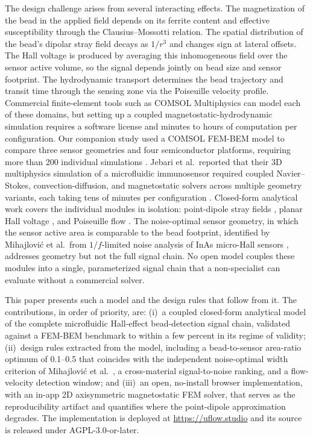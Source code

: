 \documentclass[biosensors,article,submit,pdftex,moreauthors]{Definitions/mdpi}
\begin{document}
The design challenge arises from several interacting effects. The magnetization of
the bead in the applied field depends on its ferrite content and effective
susceptibility through the Clausius--Mossotti relation. The spatial distribution
of the bead's dipolar stray field decays as $1/r^3$ and changes sign at lateral
offsets. The Hall voltage is produced by averaging this inhomogeneous field over
the sensor active volume, so the signal depends jointly on bead size and sensor
footprint. The hydrodynamic transport determines the bead trajectory and transit
time through the sensing zone via the Poiseuille velocity profile. Commercial
finite-element tools such as COMSOL Multiphysics can model each of these domains,
but setting up a coupled magnetostatic-hydrodynamic simulation requires a software
license and minutes to hours of computation per configuration. Our companion study
used a COMSOL FEM-BEM model to compare three sensor geometries and four
semiconductor platforms, requiring more than 200 individual simulations
\cite{govindaraju2025}. Jebari et al.\ reported that their 3D multiphysics
simulation of a microfluidic immunosensor required coupled Navier--Stokes,
convection-diffusion, and magnetostatic solvers across multiple geometry variants,
each taking tens of minutes per configuration \cite{jebari2024}. Closed-form
analytical work covers the individual modules in isolation: point-dipole stray
fields \cite{griffiths}, planar Hall voltage \cite{popovic2004}, and
Poiseuille flow \cite{hewlin2023}. The noise-optimal sensor geometry, in which
the sensor active area is comparable to the bead footprint, identified by
Mihajlovi\'{c} et al.\ from $1/f$-limited noise analysis of InAs micro-Hall
sensors \cite{mihajlovic2007}, addresses geometry but not the full signal chain. No open model couples these modules into a single,
parameterized signal chain that a non-specialist can evaluate without a commercial
solver.

This paper presents such a model and the design rules that follow from it. The
contributions, in order of priority, are: (i)~a coupled closed-form analytical
model of the complete microfluidic Hall-effect bead-detection signal chain,
validated against a FEM-BEM benchmark to within a few percent in its regime of
validity; (ii)~design rules extracted from the model, including a bead-to-sensor
area-ratio optimum of 0.1--0.5 that coincides with the independent noise-optimal
width criterion of Mihajlovi\'{c} et al.\ \cite{mihajlovic2007}, a cross-material
signal-to-noise ranking, and a flow-velocity detection window; and (iii)~an open,
no-install browser implementation, with an in-app 2D axisymmetric magnetostatic
FEM solver, that serves as the reproducibility artifact and quantifies where the
point-dipole approximation degrades. The implementation is deployed at
\url{https://uflow.studio} and its source is released under AGPL-3.0-or-later.
\end{document}
